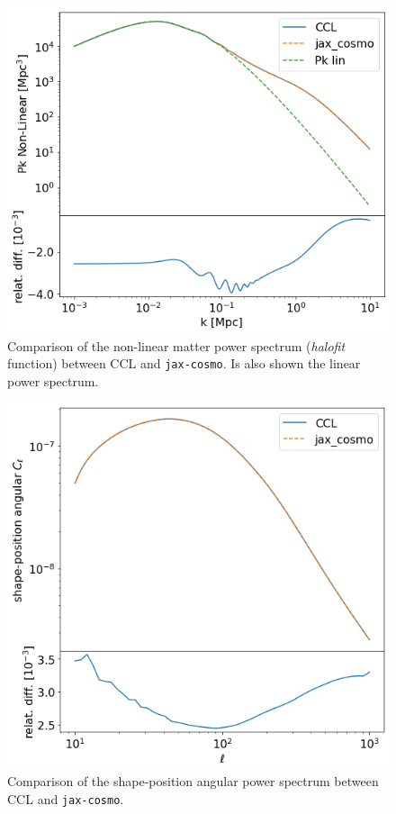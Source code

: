 \documentclass[twocolumn,twocolappendix,nofootinbib,iop]{openjournal}
\newcommand{\jaxcosmo}{\texttt{jax-cosmo}}
\begin{document}
\begin{figure}
    \centering
    \includegraphics[width=\columnwidth]{figures/halofit_pk.png}
    \caption{Comparison of the non-linear matter power spectrum (\textit{halofit} function) between CCL and \jaxcosmo. Is also shown the linear power spectrum.}     \label{fig:halofit_comparison}
\end{figure}
\begin{figure}
    \centering
    \includegraphics[width=\columnwidth]{figures/comp_Cell_shape_pos.png}
    \caption{Comparison of the shape-position angular power spectrum between CCL and \jaxcosmo.} 
    \label{fig:Cell_comparison}
\end{figure}
\end{document}
